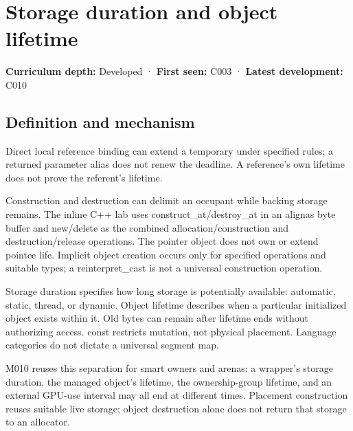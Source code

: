 \hypertarget{appendix-0b104bcba06b}{}\label{referencestart:appendix-0b104bcba06b}
\section{Storage duration and object lifetime}\label{appendix-0b104bcba06b-storage-duration-and-object-lifetime}

\hypertarget{appendix-0b104bcba06b-storage-duration-and-object-lifetime}{}

\textbf{Curriculum depth:} Developed · \textbf{First seen:} C003 · \textbf{Latest development:} C010

\begin{allmightroledefinition}

\subsection{Definition and mechanism}\label{appendix-0b104bcba06b-definition-and-mechanism}

\hypertarget{appendix-0b104bcba06b-definition-and-mechanism}{}

Direct local reference binding can extend a temporary under specified rules; a returned parameter alias does not renew the deadline. A reference's own lifetime does not prove the referent's lifetime.

\end{allmightroledefinition}

Construction and destruction can delimit an occupant while backing storage remains. The inline C++ lab uses construct\_at/destroy\_at in an alignas byte buffer and new/delete as the combined allocation/construction and destruction/release operations. The pointer object does not own or extend pointee life. Implicit object creation occurs only for specified operations and suitable types; a reinterpret\_cast is not a universal construction operation.

Storage duration specifies how long storage is potentially available: automatic, static, thread, or dynamic. Object lifetime describes when a particular initialized object exists within it. Old bytes can remain after lifetime ends without authorizing access. const restricts mutation, not physical placement. Language categories do not dictate a universal segment map.

M010 reuses this separation for smart owners and arenas: a wrapper's storage duration, the managed object's lifetime, the ownership-group lifetime, and an external GPU-use interval may all end at different times. Placement construction reuses suitable live storage; object destruction alone does not return that storage to an allocator.

